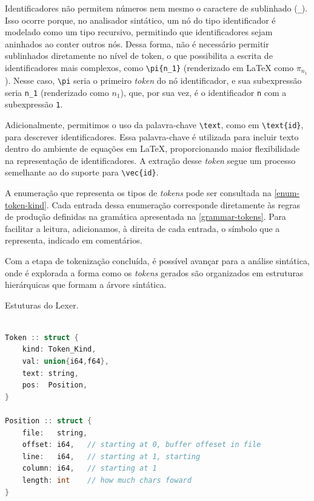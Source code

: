 \label{lexer-subexpression}
Identificadores não permitem números nem mesmo o caractere de sublinhado (\verb|_|). Isso ocorre porque, no analisador sintático, um nó do tipo identificador é modelado como um tipo recursivo, permitindo que identificadores sejam aninhados ao conter outros nós. Dessa forma, não é necessário permitir sublinhados diretamente no nível de token, o que possibilita a escrita de identificadores mais complexos, como \verb|\pi{n_1}| (renderizado em \LaTeX{} como $\pi_{n_1}$). Nesse caso, \verb|\pi| seria o primeiro \textit{token} do nó identificador, e sua subexpressão seria \verb|n_1| (renderizado como $n_1$), que, por sua vez, é o identificador \verb|n| com a subexpressão \verb|1|.

Adicionalmente, permitimos o uso da palavra-chave \verb|\text|, como em \verb|\text{id}|, para descrever identificadores. Essa palavra-chave é utilizada para incluir texto dentro do ambiente de equações em \LaTeX{}, proporcionando maior flexibilidade na representação de identificadores. A extração desse \textit{token} segue um processo semelhante ao do suporte para \verb|\vec{id}|.

A enumeração que representa os tipos de \textit{tokens} pode ser consultada na \autoref{enum-token-kind}. Cada entrada dessa enumeração corresponde diretamente às regras de produção definidas na gramática apresentada na \autoref{grammar-tokens}. Para facilitar a leitura, adicionamos, à direita de cada entrada, o símbolo que a representa, indicado em comentários.

Com a etapa de tokenização concluída, é possível avançar para a análise sintática, onde é explorada a forma como os \textit{tokens} gerados são organizados em estruturas hierárquicas que formam a árvore sintática.

\begin{codigo}[htb]
        \caption{\small Estuturas do Lexer. }
        \label{lexer-structs}
\begin{lstlisting}[language=C++]

Token :: struct {
    kind: Token_Kind,
    val: union{i64,f64},
    text: string,
    pos:  Position,
}

Position :: struct {
    file:   string,
    offset: i64,   // starting at 0, buffer offeset in file
    line:   i64,   // starting at 1, starting
    column: i64,   // starting at 1
    length: int    // how much chars foward
}
    
  \end{lstlisting}
\end{codigo}


